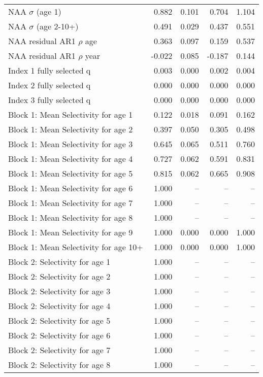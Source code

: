 \documentclass[
]{article}
\begin{document}
\begin{landscape}
\begin{longtable}[t]{lrrrr}
\endfoot
\bottomrule
\endlastfoot
NAA $\sigma$ (age 1) & 0.882 & 0.101 & 0.704 & 1.104\\
NAA $\sigma$ (age 2-10+) & 0.491 & 0.029 & 0.437 & 0.551\\
NAA residual AR1 $\rho$ age & 0.363 & 0.097 & 0.159 & 0.537\\
NAA residual AR1 $\rho$ year & -0.022 & 0.085 & -0.187 & 0.144\\
Index 1 fully selected q & 0.003 & 0.000 & 0.002 & 0.004\\
\addlinespace
Index 2 fully selected q & 0.000 & 0.000 & 0.000 & 0.000\\
Index 3 fully selected q & 0.000 & 0.000 & 0.000 & 0.000\\
Block 1: Mean Selectivity for age 1 & 0.122 & 0.018 & 0.091 & 0.162\\
Block 1: Mean Selectivity for age 2 & 0.397 & 0.050 & 0.305 & 0.498\\
Block 1: Mean Selectivity for age 3 & 0.645 & 0.065 & 0.511 & 0.760\\
\addlinespace
Block 1: Mean Selectivity for age 4 & 0.727 & 0.062 & 0.591 & 0.831\\
Block 1: Mean Selectivity for age 5 & 0.815 & 0.062 & 0.665 & 0.908\\
Block 1: Mean Selectivity for age 6 & 1.000 & -- & -- & --\\
Block 1: Mean Selectivity for age 7 & 1.000 & -- & -- & --\\
Block 1: Mean Selectivity for age 8 & 1.000 & -- & -- & --\\
\addlinespace
Block 1: Mean Selectivity for age 9 & 1.000 & 0.000 & 0.000 & 1.000\\
Block 1: Mean Selectivity for age 10+ & 1.000 & 0.000 & 0.000 & 1.000\\
Block 2: Selectivity for age 1 & 1.000 & -- & -- & --\\
Block 2: Selectivity for age 2 & 1.000 & -- & -- & --\\
Block 2: Selectivity for age 3 & 1.000 & -- & -- & --\\
\addlinespace
Block 2: Selectivity for age 4 & 1.000 & -- & -- & --\\
Block 2: Selectivity for age 5 & 1.000 & -- & -- & --\\
Block 2: Selectivity for age 6 & 1.000 & -- & -- & --\\
Block 2: Selectivity for age 7 & 1.000 & -- & -- & --\\
Block 2: Selectivity for age 8 & 1.000 & -- & -- & --\\

\end{longtable}
\end{landscape}
\end{document}
